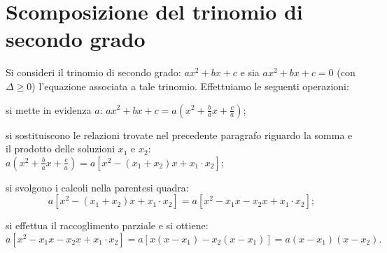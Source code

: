 \section{Scomposizione del trinomio di secondo grado}
Si consideri il trinomio di secondo grado: $a x^{2} + b x + c$ e sia $a x^{2} + b x + c = 0$ (con $\Delta \geq 0$) l’equazione associata a tale trinomio. Effettuiamo le seguenti operazioni:
\begin{itemize*}
\item si mette in evidenza $a$: $a x^{2} + b x + c = a \left( x^{2} + \frac{b}{a} x + \frac{c}{a} \right)$;
\item si sostituiscono le relazioni trovate nel precedente paragrafo riguardo la somma e il prodotto delle soluzioni $x_{1}$ e $x_{2}$: $a \left( x^{2} + \frac{b}{a} x + \frac{c}{a} \right) = a \left[x^{2} - ( x_{1} + x_{2} ) x + x_{1} \cdot x_{2} \right]$;
\item si svolgono i calcoli nella parentesi quadra:
\[a \left[ x^{2} - ( x_{1} + x_{2} ) x + x_{1} \cdot x_{2}\right] = a\left[ x^{2} - x_{1} x - x_{2} x + x_{1} \cdot x_{2}\right];\]
\item si effettua il raccoglimento parziale e si ottiene:
\[a \left[x^{2} - x_{1} x - x_{2} x + x_{1} \cdot x_{2}\right] = a \left[ {x \left(x - x_{1} \right) - x_{2} \left( x - x_{1}\right)}\right] = a \left( x - x_{1} \right) \left( x - x_{2} \right).\]
\end{itemize*}

